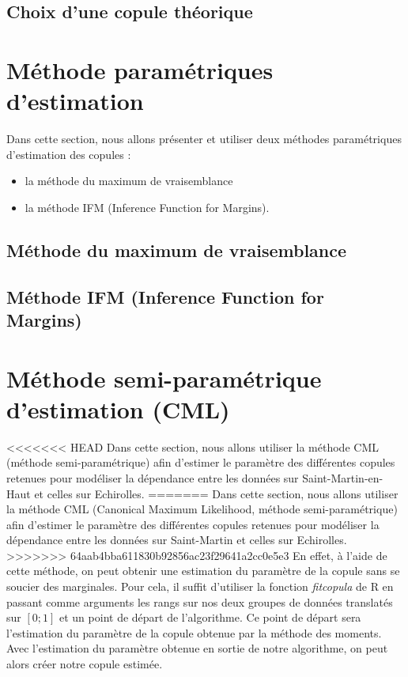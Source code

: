 \subsection{Choix d'une copule théorique}










\section{Méthode paramétriques d'estimation}

Dans cette section, nous allons présenter et utiliser deux méthodes paramétriques d'estimation
des copules :

\begin{itemize}
\item la méthode du maximum de vraisemblance
\item la méthode IFM (Inference Function for Margins).
\end{itemize}

\subsection{Méthode du maximum de vraisemblance}

\subsection{Méthode IFM (Inference Function for Margins)}


\section{Méthode semi-paramétrique d'estimation (CML)}

<<<<<<< HEAD
Dans cette section, nous allons utiliser la méthode CML (méthode semi-paramétrique) afin d'estimer le paramètre des différentes copules retenues pour modéliser la dépendance entre les données sur Saint-Martin-en-Haut et celles sur Echirolles.
=======
Dans cette section, nous allons utiliser la méthode CML (Canonical Maximum Likelihood, méthode semi-paramétrique) afin d'estimer le paramètre des différentes copules retenues pour modéliser la dépendance entre les données sur Saint-Martin et celles sur Echirolles.
>>>>>>> 64aab4bba611830b92856ac23f29641a2cc0e5e3
En effet, à l'aide de cette méthode, on peut obtenir une estimation du paramètre de la copule sans se soucier des marginales. Pour cela, il suffit d'utiliser la fonction \textit{fitcopula} de R en passant comme arguments les rangs sur nos deux groupes de données translatés sur $[0;1]$ et un point de départ de l'algorithme. Ce point de départ sera l'estimation du paramètre de la copule obtenue par la méthode des moments. Avec l'estimation du paramètre obtenue en sortie de notre algorithme, on peut alors créer notre copule estimée.

